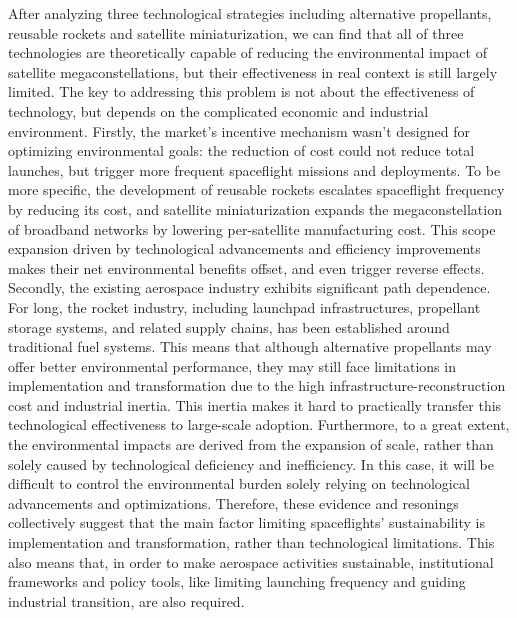 \documentclass[12pt]{article}
\begin{document}
After analyzing three technological strategies including alternative propellants, reusable rockets and satellite miniaturization, we can find that all of three technologies are theoretically capable of reducing the environmental impact of satellite megaconstellations, but their effectiveness in real context is still largely limited. The key to addressing this problem is not about the effectiveness of technology, but depends on the complicated economic and industrial environment. Firstly, the market's incentive mechanism wasn't designed for optimizing environmental goals: the reduction of cost could not reduce total launches, but trigger more frequent spaceflight missions and deployments. To be more specific, the development of reusable rockets escalates spaceflight frequency by reducing its cost, and satellite miniaturization expands the megaconstellation of broadband networks by lowering per-satellite manufacturing cost. This scope expansion driven by technological advancements and efficiency improvements makes their net environmental benefits offset, and even trigger reverse effects. Secondly, the existing aerospace industry exhibits significant path dependence. For long, the rocket industry, including launchpad infrastructures, propellant storage systems, and related supply chains, has been established around traditional fuel systems. This means that although alternative propellants may offer better environmental performance, they may still face limitations in implementation and transformation due to the high infrastructure-reconstruction cost and industrial inertia. This inertia makes it hard to practically transfer this technological effectiveness to large-scale adoption. Furthermore, to a great extent, the environmental impacts are derived from the expansion of scale, rather than solely caused by technological deficiency and inefficiency. In this case, it will be difficult to control the environmental burden solely relying on technological advancements and optimizations. Therefore, these evidence and resonings collectively suggest that the main factor limiting spaceflights' sustainability is implementation and transformation, rather than technological limitations. This also means that, in order to make aerospace activities sustainable, institutional frameworks and policy tools, like limiting launching frequency and guiding industrial transition, are also required.
\end{document}
